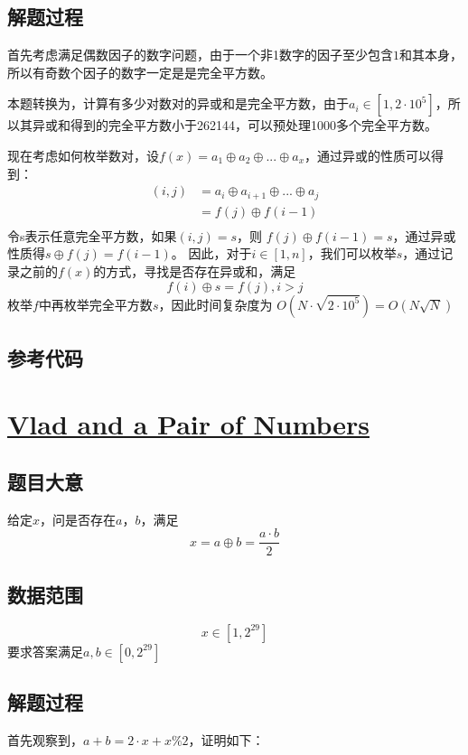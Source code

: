 \documentclass[UTF8]{ctexart}
\begin{document}
	\subsection{解题过程}
	首先考虑满足偶数因子的数字问题，由于一个非1数字的因子至少包含$1$和其本身，所以有奇数个因子的数字一定是是完全平方数。
	
	本题转换为，计算有多少对数对的异或和是完全平方数，由于$a_i\in [1,2\cdot10^5]$，所以其异或和得到的完全平方数小于262144，可以预处理1000多个完全平方数。
	
	现在考虑如何枚举数对，设$f(x)=a_1\oplus a_{2}\oplus ...\oplus a_x$，通过异或的性质可以得到：
	\begin{equation}
		\begin{aligned}
		(i,j)&=a_i\oplus a_{i+1}\oplus ...\oplus a_j \\
			&=f(j)\oplus f(i-1) \\
		\end{aligned}
	\end{equation}
	令s表示任意完全平方数，如果$(i,j)=s$，则
	$f(j)\oplus f(i-1)=s$，通过异或性质得$s\oplus f(j)=f(i-1)$。
	因此，对于$i\in [1,n]$，我们可以枚举$s$，通过记录之前的$f(x)$的方式，寻找是否存在异或和，满足
	$$
	f(i)\oplus s=f(j),i>j
	$$
	枚举$f$中再枚举完全平方数$s$，因此时间复杂度为
	$O(N\cdot \sqrt{2\cdot10^5})=O(N\sqrt{N})$
	\subsection{参考代码}
	
	
	
	\section{\href{https://codeforces.com/contest/1790/problem/E}{Vlad and a Pair of Numbers}}
	\subsection{题目大意}
	给定$x$，问是否存在$a$，$b$，满足
	$$
	x=a\oplus b = \frac{a\cdot b}{2}
	$$
	\subsection{数据范围}
	$$
	x \in [1,2^{29}]
	$$
	要求答案满足$a,b \in [0,2^{29}]$
	\subsection{解题过程}
	首先观察到，$a+b=2\cdot x+x\%2$，证明如下：
	
\end{document}

